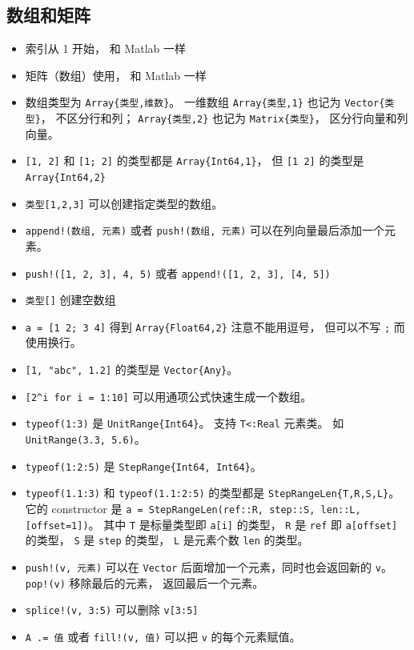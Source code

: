 \subsection{数组和矩阵}
\begin{itemize}
\item 索引从 1 开始， 和 Matlab 一样
\item 矩阵（数组）使用， 和 Matlab 一样
\item 数组类型为 \verb`Array{类型,维数}`。 一维数组 \verb`Array{类型,1}` 也记为 \verb`Vector{类型}`， 不区分行和列； \verb`Array{类型,2}` 也记为 \verb`Matrix{类型}`， 区分行向量和列向量。
\item \verb`[1, 2]` 和 \verb`[1; 2]` 的类型都是 \verb`Array{Int64,1}`， 但 \verb`[1 2]` 的类型是 \verb`Array{Int64,2}`
\item \verb`类型[1,2,3]` 可以创建指定类型的数组。
\item \verb`append!(数组, 元素)` 或者 \verb`push!(数组, 元素)` 可以在列向量最后添加一个元素。
\item \verb`push!([1, 2, 3], 4, 5)` 或者 \verb`append!([1, 2, 3], [4, 5])`
\item \verb`类型[]` 创建空数组
\item \verb`a = [1 2; 3 4]` 得到 \verb`Array{Float64,2}` 注意不能用逗号， 但可以不写 \verb`;` 而使用换行。
\item \verb`[1, "abc", 1.2]` 的类型是 \verb`Vector{Any}`。
\item \verb`[2^i for i = 1:10]` 可以用通项公式快速生成一个数组。
\item \verb`typeof(1:3)` 是 \verb`UnitRange{Int64}`。 支持 \verb`T<:Real` 元素类。 如 \verb`UnitRange(3.3, 5.6)`。
\item \verb`typeof(1:2:5)` 是 \verb`StepRange{Int64, Int64}`。
\item \verb`typeof(1.1:3)` 和 \verb`typeof(1.1:2:5)` 的类型都是 \verb`StepRangeLen{T,R,S,L}`。 它的 constructor 是 \verb`a = StepRangeLen(ref::R, step::S, len::L, [offset=1])`。 其中 \verb`T` 是标量类型即 \verb`a[i]` 的类型， \verb`R` 是 \verb`ref` 即 \verb`a[offset]` 的类型， \verb`S` 是 \verb`step` 的类型， \verb`L` 是元素个数 \verb`len` 的类型。
\item \verb`push!(v, 元素)` 可以在 \verb`Vector` 后面增加一个元素，同时也会返回新的 \verb`v`。 \verb`pop!(v)` 移除最后的元素， 返回最后一个元素。
\item \verb`splice!(v, 3:5)` 可以删除 \verb`v[3:5]`
\item \verb`A .= 值` 或者 \verb`fill!(v, 值)` 可以把 \verb`v` 的每个元素赋值。

\end{itemize}
